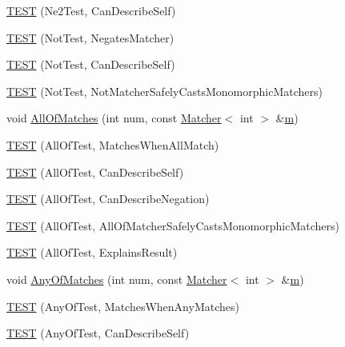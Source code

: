 \begin{DoxyCompactItemize}
\item 
\hyperlink{namespacetesting_1_1gmock__matchers__test_acedf2eda13385067ee70bdb7d6073427}{T\+E\+ST} (Ne2\+Test, Can\+Describe\+Self)
\item 
\hyperlink{namespacetesting_1_1gmock__matchers__test_ab41b57eeaea5568064b6ed3725316c73}{T\+E\+ST} (Not\+Test, Negates\+Matcher)
\item 
\hyperlink{namespacetesting_1_1gmock__matchers__test_a831db2bf90c3950953cdceaefebddd40}{T\+E\+ST} (Not\+Test, Can\+Describe\+Self)
\item 
\hyperlink{namespacetesting_1_1gmock__matchers__test_a46849e0c019e331f830ed91137fa417a}{T\+E\+ST} (Not\+Test, Not\+Matcher\+Safely\+Casts\+Monomorphic\+Matchers)
\item 
void \hyperlink{namespacetesting_1_1gmock__matchers__test_a51d8731c3824a6acdaa594645dd46779}{All\+Of\+Matches} (int num, const \hyperlink{classtesting_1_1Matcher}{Matcher}$<$ int $>$ \&\hyperlink{app_2main_8cpp_a0d2d8836216fc94b61aa0824eb239db2}{m})
\item 
\hyperlink{namespacetesting_1_1gmock__matchers__test_a7714d041eb2dd2e233db7f175fedef5a}{T\+E\+ST} (All\+Of\+Test, Matches\+When\+All\+Match)
\item 
\hyperlink{namespacetesting_1_1gmock__matchers__test_a31056975d89eea2786997cf18b086bf4}{T\+E\+ST} (All\+Of\+Test, Can\+Describe\+Self)
\item 
\hyperlink{namespacetesting_1_1gmock__matchers__test_a86c15b3bc163321c7a56aeb0b1709b87}{T\+E\+ST} (All\+Of\+Test, Can\+Describe\+Negation)
\item 
\hyperlink{namespacetesting_1_1gmock__matchers__test_a4196a4000390e2378954d55b4f6d2893}{T\+E\+ST} (All\+Of\+Test, All\+Of\+Matcher\+Safely\+Casts\+Monomorphic\+Matchers)
\item 
\hyperlink{namespacetesting_1_1gmock__matchers__test_a2b9f4a791dd4f1fb9f8a1400883a5db4}{T\+E\+ST} (All\+Of\+Test, Explains\+Result)
\item 
void \hyperlink{namespacetesting_1_1gmock__matchers__test_aa4e9deb0a98413e62516451e7c060c7a}{Any\+Of\+Matches} (int num, const \hyperlink{classtesting_1_1Matcher}{Matcher}$<$ int $>$ \&\hyperlink{app_2main_8cpp_a0d2d8836216fc94b61aa0824eb239db2}{m})
\item 
\hyperlink{namespacetesting_1_1gmock__matchers__test_a4949d40a1ac77182274189c21848af00}{T\+E\+ST} (Any\+Of\+Test, Matches\+When\+Any\+Matches)
\item 
\hyperlink{namespacetesting_1_1gmock__matchers__test_a00bd490bf974b3f3485a1b0fde9fa490}{T\+E\+ST} (Any\+Of\+Test, Can\+Describe\+Self)

\end{DoxyCompactItemize}
